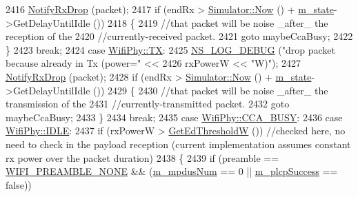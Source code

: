 \begin{DoxyCode}
2416       \hyperlink{classns3_1_1WifiPhy_a72138f22fada63f61f2026b86aa5abd2}{NotifyRxDrop} (packet);
2417       \textcolor{keywordflow}{if} (endRx > \hyperlink{classns3_1_1Simulator_ac3178fa975b419f7875e7105be122800}{Simulator::Now} () + \hyperlink{classns3_1_1WifiPhy_a020dae8902d858e3d121aa7a67ca2528}{m\_state}->GetDelayUntilIdle ())
2418         \{
2419           \textcolor{comment}{//that packet will be noise \_after\_ the reception of the}
2420           \textcolor{comment}{//currently-received packet.}
2421           \textcolor{keywordflow}{goto} maybeCcaBusy;
2422         \}
2423       \textcolor{keywordflow}{break};
2424     \textcolor{keywordflow}{case} \hyperlink{classns3_1_1WifiPhy_af97408fa76f99797497b492758467143a69db14ff4bed82ca0242f8b09065ff09}{WifiPhy::TX}:
2425       \hyperlink{group__logging_ga413f1886406d49f59a6a0a89b77b4d0a}{NS\_LOG\_DEBUG} (\textcolor{stringliteral}{"drop packet because already in Tx (power="} <<
2426                     rxPowerW << \textcolor{stringliteral}{"W)"});
2427       \hyperlink{classns3_1_1WifiPhy_a72138f22fada63f61f2026b86aa5abd2}{NotifyRxDrop} (packet);
2428       \textcolor{keywordflow}{if} (endRx > \hyperlink{classns3_1_1Simulator_ac3178fa975b419f7875e7105be122800}{Simulator::Now} () + \hyperlink{classns3_1_1WifiPhy_a020dae8902d858e3d121aa7a67ca2528}{m\_state}->GetDelayUntilIdle ())
2429         \{
2430           \textcolor{comment}{//that packet will be noise \_after\_ the transmission of the}
2431           \textcolor{comment}{//currently-transmitted packet.}
2432           \textcolor{keywordflow}{goto} maybeCcaBusy;
2433         \}
2434       \textcolor{keywordflow}{break};
2435     \textcolor{keywordflow}{case} \hyperlink{classns3_1_1WifiPhy_af97408fa76f99797497b492758467143aaec7a6711c1e391040d923fc0efcc849}{WifiPhy::CCA\_BUSY}:
2436     \textcolor{keywordflow}{case} \hyperlink{classns3_1_1WifiPhy_af97408fa76f99797497b492758467143ab82b721cfd612ae187d78ffc812c567d}{WifiPhy::IDLE}:
2437       \textcolor{keywordflow}{if} (rxPowerW > \hyperlink{classns3_1_1WifiPhy_aec8d35c73d4305da205e71e5f3373028}{GetEdThresholdW} ()) \textcolor{comment}{//checked here, no need to check in the payload
       reception (current implementation assumes constant rx power over the packet duration)}
2438         \{
2439           \textcolor{keywordflow}{if} (preamble == \hyperlink{group__wifi_gga5e94a56cb338a14ffbbb19c6a41251eba97c5c71995de5f28931200e6d5a38a66}{WIFI\_PREAMBLE\_NONE} && (\hyperlink{classns3_1_1WifiPhy_aea15140c77315a8bf71eff068ea6570e}{m\_mpdusNum} == 0 || 
      \hyperlink{classns3_1_1WifiPhy_ad9a571bc52ef6cd8e63cff3dc14a718e}{m\_plcpSuccess} == \textcolor{keyword}{false}))

\end{DoxyCode}

